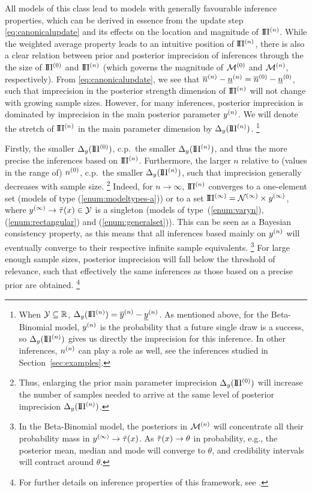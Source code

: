 All models of this class lead to models with generally favourable inference properties,
which can be derived in essence from the update step \eqref{eq:canonicalupdate}
and its effects on the location and magnitude of $\text{I}\!\Pi^{(n)}$.
While the weighted average property leads to an intuitive position of $\text{I}\!\Pi^{(n)}$,
there is also a clear relation between prior and posterior imprecision of inferences
through the the size of $\text{I}\!\Pi^{(0)}$ and $\text{I}\!\Pi^{(n)}$ (which governs the magnitude of $\mathcal{M}^{(0)}$ and $\mathcal{M}^{(n)}$, respectively).
From \eqref{eq:canonicalupdate}, we see that $\overline{n}^{(n)} - \underline{n}^{(n)} = \overline{n}^{(0)} - \underline{n}^{(0)}$,
such that imprecision in the posterior strength dimension of $\text{I}\!\Pi^{(n)}$ will not change with growing sample sizes.
However, for many inferences, posterior imprecision is dominated by
imprecision in the main posterior parameter $y^{(n)}$.
We will denote the stretch of $\text{I}\!\Pi^{(n)}$ in the main parameter dimension by $\Delta_y(\text{I}\!\Pi^{(n)})$.%
\footnote{When $\mathcal{Y} \subseteq \mathbb{R}$, $\Delta_y(\text{I}\!\Pi^{(n)}) = \overline{y}^{(n)} -\underline{y}^{(n)}$.
As mentioned above, for the Beta-Binomial model,
$y^{(n)}$ is the probability that a future single draw is a success,
so $\Delta_y(\text{I}\!\Pi^{(n)})$ gives us directly the imprecision for this inference.
In other inferences, $n^{(n)}$ can play a role as well,
see the inferences studied in Section~\ref{sec:examples}.}

Firstly, the smaller $\Delta_y(\text{I}\!\Pi^{(0)})$, c.p.\ the smaller $\Delta_y(\text{I}\!\Pi^{(n)})$,
and thus the more precise the inferences based on $\text{I}\!\Pi^{(n)}$.
Furthermore, the larger $n$ relative to (values in the range of) $n^{(0)}$,
c.p.\ the smaller $\Delta_y(\text{I}\!\Pi^{(n)})$, such that imprecision generally decreases with sample size.%
\footnote{Thus, enlarging the prior main parameter imprecision $\Delta_y(\text{I}\!\Pi^{(0)})$ will increase the number of samples needed to
arrive at the same level of posterior imprecision $\Delta_y(\text{I}\!\Pi^{(n)})$.}
Indeed, for $n \to \infty$, $\text{I}\!\Pi^{(n)}$ converges to a one-element set (models of type (\ref{enum:modeltypes-a}))
or to a set $\text{I}\!\Pi^{(\infty)} = \mathcal{N}^{(\infty)} \times y^{(\infty)}$,
where $y^{(\infty)} \to \tilde{\tau}(x) \in \mathcal{Y}$ is a singleton 
(models of type~(\ref{enum:varyn}), (\ref{enum:rectangular}) and (\ref{enum:generalset})).
This can be seen as a Bayesian consistency property, as this means that all inferences based mainly on $y^{(n)}$
will eventually converge to their respective infinite sample equivalents.%
\footnote{In the Beta-Binomial model,
the posteriors in $\mathcal{M}^{(n)}$ will concentrate all their probability mass in $y^{(\infty)} \to \tilde{\tau}(x)$.
As $\tilde{\tau}(x) \to \theta$ in probability, e.g., the posterior mean, median and mode will converge to $\theta$,
and credibility intervals will contract around $\theta$.}
For large enough sample sizes, posterior imprecision will fall below the threshold of relevance,
such that effectively the same inferences as those based on a precise prior are obtained.%
\footnote{For further details on inference properties of this framework, see \citet[\S 3.1.2]{diss-gw}.}

